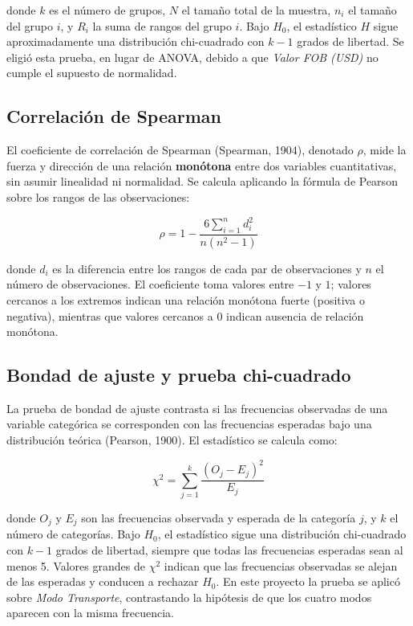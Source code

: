 \documentclass[12pt]{article}
\begin{document}
donde \(k\) es el número de grupos, \(N\) el tamaño total de la
muestra, \(n_i\) el tamaño del grupo \(i\), y \(R_i\) la suma de
rangos del grupo \(i\). Bajo \(H_0\), el estadístico \(H\) sigue
aproximadamente una distribución chi-cuadrado con \(k-1\) grados de
libertad. Se eligió esta prueba, en lugar de ANOVA, debido a que
\emph{Valor FOB (USD)} no cumple el supuesto de normalidad.

\subsection*{Correlación de Spearman}

El coeficiente de correlación de Spearman (Spearman, 1904), denotado
\(\rho\), mide la fuerza y dirección de una relación \textbf{monótona}
entre dos variables cuantitativas, sin asumir linealidad ni
normalidad. Se calcula aplicando la fórmula de Pearson sobre los
rangos de las observaciones:

\[
\rho = 1 - \frac{6 \sum_{i=1}^{n} d_i^2}{n(n^2-1)}
\]

donde \(d_i\) es la diferencia entre los rangos de cada par de
observaciones y \(n\) el número de observaciones. El coeficiente toma
valores entre \(-1\) y \(1\); valores cercanos a los extremos indican
una relación monótona fuerte (positiva o negativa), mientras que
valores cercanos a 0 indican ausencia de relación monótona.

\subsection*{Bondad de ajuste y prueba chi-cuadrado}

La prueba de bondad de ajuste contrasta si las frecuencias observadas de
una variable categórica se corresponden con las frecuencias esperadas
bajo una distribución teórica (Pearson, 1900). El estadístico se
calcula como:

\[
\chi^2 = \sum_{j=1}^{k} \frac{(O_j - E_j)^2}{E_j}
\]

donde \(O_j\) y \(E_j\) son las frecuencias observada y esperada de la
categoría \(j\), y \(k\) el número de categorías. Bajo \(H_0\), el
estadístico sigue una distribución chi-cuadrado con \(k-1\) grados de
libertad, siempre que todas las frecuencias esperadas sean al menos 5.
Valores grandes de \(\chi^2\) indican que las frecuencias observadas se
alejan de las esperadas y conducen a rechazar \(H_0\). En este proyecto
la prueba se aplicó sobre \emph{Modo Transporte}, contrastando la
hipótesis de que los cuatro modos aparecen con la misma frecuencia.
\end{document}
